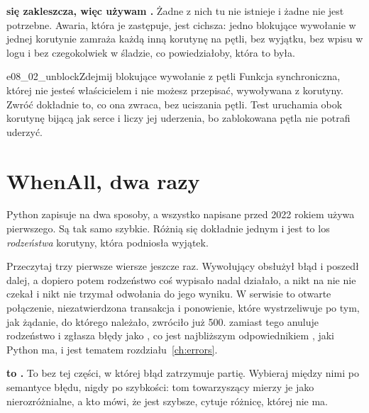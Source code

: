\begin{trapbox}
\textbf{ się zakleszcza, więc używam
.} Żadne z nich tu nie istnieje i żadne nie
jest potrzebne. Awaria, która je zastępuje, jest cichsza: jedno blokujące
wywołanie w jednej korutynie zamraża każdą inną korutynę na pętli, bez
wyjątku, bez wpisu w logu i bez czegokolwiek w śladzie, co powiedziałoby,
która to była.
\end{trapbox}

\begin{exercise}{e08_02_unblock}{Zdejmij blokujące wywołanie z pętli}
Funkcja synchroniczna, której nie jesteś właścicielem i nie możesz
przepisać, wywoływana z korutyny. Zwróć dokładnie to, co ona zwraca, bez
uciszania pętli. Test uruchamia obok korutynę bijącą jak serce i liczy jej
uderzenia, bo zablokowana pętla nie potrafi uderzyć.
\end{exercise}

\section{WhenAll, dwa razy}
\label{sec:asyncio-whenall}

Python zapisuje  na dwa sposoby, a wszystko napisane
przed 2022 rokiem używa pierwszego. Są tak samo szybkie. Różnią się
dokładnie jednym i jest to los \emph{rodzeństwa} korutyny, która podniosła
wyjątek.



\noindent
Przeczytaj trzy pierwsze wiersze jeszcze raz. Wywołujący obsłużył błąd i
poszedł dalej, a dopiero potem rodzeństwo coś wypisało \dash{} nadal
działało, a nikt na nie nie czekał i nikt nie trzymał odwołania do jego
wyniku. W serwisie to otwarte połączenie, niezatwierdzona transakcja i
ponowienie, które wystrzeliwuje po tym, jak żądanie, do którego należało,
zwróciło już 500.  zamiast tego anuluje rodzeństwo i zgłasza
błędy jako , co jest najbliższym odpowiednikiem
, jaki Python ma, i jest tematem
rozdziału~\ref{ch:errors}.

\begin{trapbox}
\textbf{ to .} To  bez tej
części, w której błąd zatrzymuje partię. Wybieraj między nimi po semantyce
błędu, nigdy po szybkości: tom towarzyszący mierzy je jako nierozróżnialne,
a kto mówi, że  jest szybsze, cytuje różnicę, której nie ma.
\end{trapbox}

